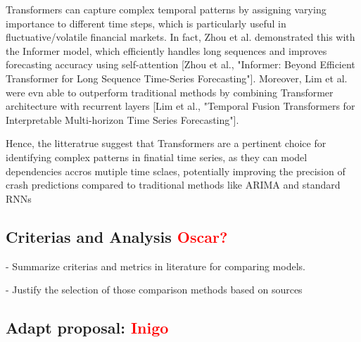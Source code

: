 \documentclass[12pt, letterpaper]{article}
\begin{document}
Transformers can capture complex temporal patterns by assigning varying importance to different time steps, which is particularly useful in fluctuative/volatile financial markets. In fact, Zhou et al. demonstrated this with the Informer model, which efficiently handles long sequences and improves forecasting accuracy using self-attention [Zhou et al., "Informer: Beyond Efficient Transformer for Long Sequence Time-Series Forecasting"]. Moreover, Lim et al.  were evn able to outperform traditional methods by combining Transformer architecture with recurrent layers [Lim et al., "Temporal Fusion Transformers for Interpretable Multi-horizon Time Series Forecasting"].

Hence, the litteratrue suggest that Transformers are a pertinent choice for identifying complex patterns in finatial time series, as they can model dependencies accros mutiple time sclaes, potentially improving the precision of crash predictions compared to traditional methods like ARIMA and standard RNNs



\subsection*{Criterias and Analysis \textcolor{red}{Oscar?}}
- Summarize criterias and metrics in literature for comparing models.

- Justify the selection of those comparison methods based on sources



\subsection*{Adapt proposal: \textcolor{red}{Inigo}}
\end{document}
